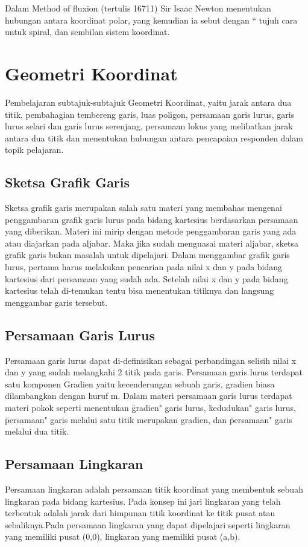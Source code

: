 Dalam Method of fluxion (tertulis 16711) Sir Isaac Newton menentukan hubungan antara koordinat polar, yang kemudian ia sebut dengan “ tujuh cara untuk spiral, dan sembilan sistem koordinat. 

\section{Geometri Koordinat}
 Pembelajaran subtajuk-subtajuk Geometri Koordinat, yaitu jarak antara dua titik, pembahagian tembereng garis, luas poligon, persamaan garis lurus, garis lurus selari dan garis lurus serenjang, persamaan lokus yang melibatkan jarak antara dua titik dan menentukan hubungan antara pencapaian responden dalam topik pelajaran\cite{shong2013analisis}.
 
 \subsection{Sketsa Grafik Garis}
 Sketsa grafik garis merupakan salah satu materi yang membahas mengenai penggambaran grafik garis lurus pada bidang kartesius berdasarkan persamaan yang diberikan. Materi ini mirip dengan metode penggambaran garis yang ada atau diajarkan pada aljabar. Maka jika sudah menguasai materi aljabar, sketsa grafik garis bukan masalah untuk dipelajari. Dalam menggambar grafik garis lurus, pertama harus melakukan pencarian pada nilai x dan y pada bidang kartesius dari persamaan yang sudah ada. Setelah nilai x dan y pada bidang kartesius telah di-temukan tentu bisa menentukan titiknya dan langsung menggambar garis tersebut.
 
 \subsection{Persamaan Garis Lurus}
 Persamaan garis lurus dapat di-definisikan sebagai perbandingan selisih nilai x dan y yang sudah melangkahi 2 titik pada garis. 
 Persamaan garis lurus terdapat satu komponen Gradien yaitu kecenderungan sebuah garis, gradien biasa dilambangkan dengan huruf m.
 Dalam materi persamaan garis lurus terdapat materi pokok seperti menentukan \"gradien" garis lurus, \"kedudukan" garis lurus,
 \"persamaan" garis melalui satu titik merupakan gradien, dan \"persamaan" garis melalui dua titik.
 
 \subsection{Persamaan Lingkaran}
Persamaan lingkaran adalah persamaan titik koordinat yang membentuk sebuah lingkaran pada bidang kartesius. Pada konsep ini jari lingkaran yang telah terbentuk adalah jarak dari himpunan titik koordinat ke titik pusat atau sebaliknya.Pada persamaan lingkaran yang dapat dipelajari seperti lingkaran yang memiliki pusat (0,0), lingkaran yang memiliki pusat (a,b).
 
